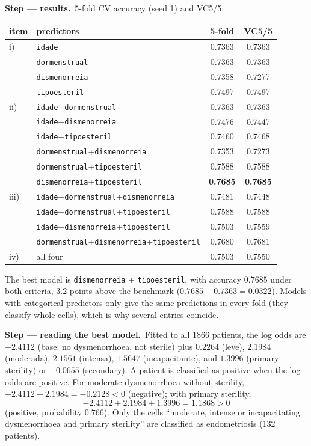\documentclass[11pt,a4paper]{article}
\numberwithin{equation}{questao}   %
\newcommand{\passo}[2]{\par\smallskip\noindent\textbf{Step --- #1.}~#2}
\begin{document}
\begin{sol}
\passo{results}{5-fold CV accuracy (seed 1) and VC5/5:
\begin{center}\small\begin{tabular}{llcc}\toprule
item & predictors & 5-fold & VC5/5\\\midrule
i) & \texttt{idade} & 0.7363 & 0.7363\\
   & \texttt{dormenstrual} & 0.7363 & 0.7363\\
   & \texttt{dismenorreia} & 0.7358 & 0.7277\\
   & \texttt{tipoesteril} & 0.7497 & 0.7497\\
ii) & \texttt{idade}+\texttt{dormenstrual} & 0.7363 & 0.7363\\
   & \texttt{idade}+\texttt{dismenorreia} & 0.7476 & 0.7447\\
   & \texttt{idade}+\texttt{tipoesteril} & 0.7460 & 0.7468\\
   & \texttt{dormenstrual}+\texttt{dismenorreia} & 0.7353 & 0.7273\\
   & \texttt{dormenstrual}+\texttt{tipoesteril} & 0.7588 & 0.7588\\
   & \texttt{dismenorreia}+\texttt{tipoesteril} & \textbf{0.7685} & \textbf{0.7685}\\
iii) & \texttt{idade}+\texttt{dormenstrual}+\texttt{dismenorreia} & 0.7481 & 0.7448\\
   & \texttt{idade}+\texttt{dormenstrual}+\texttt{tipoesteril} & 0.7588 & 0.7588\\
   & \texttt{idade}+\texttt{dismenorreia}+\texttt{tipoesteril} & 0.7503 & 0.7559\\
   & \texttt{dormenstrual}+\texttt{dismenorreia}+\texttt{tipoesteril} & 0.7680 & 0.7681\\
iv) & all four & 0.7503 & 0.7550\\\bottomrule\end{tabular}\end{center}
The best model is \texttt{dismenorreia} + \texttt{tipoesteril}, with accuracy $0.7685$ under both criteria,
3.2 points above the benchmark ($0.7685-0.7363=0.0322$). Models with categorical predictors only give
the same predictions in every fold (they classify whole cells), which is why several entries coincide.}

\passo{reading the best model}{Fitted to all 1866 patients, the log odds are $-2.4112$ (base:
no dysmenorrhoea, not sterile) plus $0.2264$ (leve), $2.1984$ (moderada), $2.1561$ (intensa),
$1.5647$ (incapacitante), and $1.3996$ (primary sterility) or $-0.0655$ (secondary). A patient is
classified as positive when the log odds are positive. For moderate dysmenorrhoea without sterility,
$-2.4112+2.1984=-0.2128<0$ (negative); with primary sterility,
\begin{equation}\label{eq:M6-eta}
-2.4112+2.1984+1.3996=1.1868>0
\end{equation}
(positive, probability $0.766$). Only the cells ``moderate, intense or incapacitating
dysmenorrhoea and primary sterility'' are classified as endometriosis (132 patients).}


\end{sol}
\end{document}
